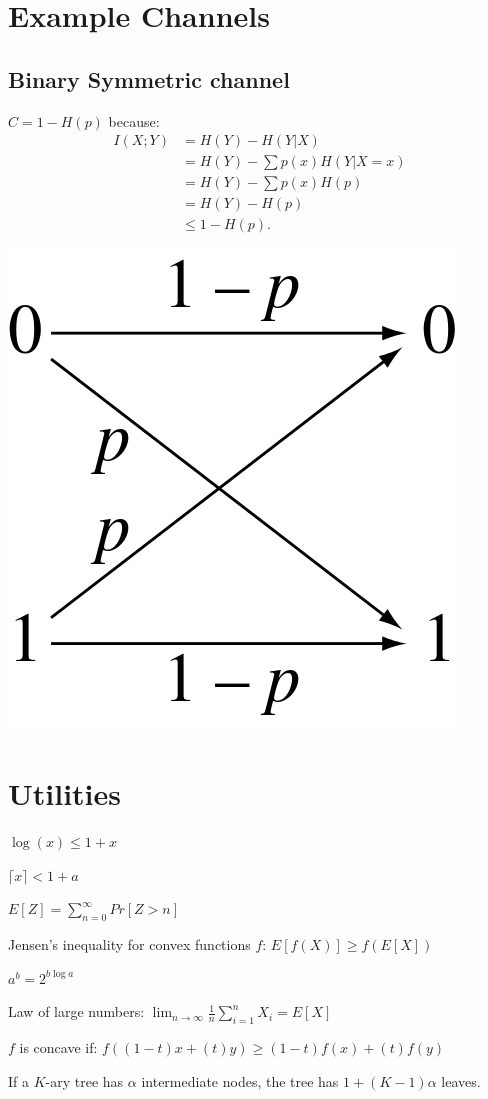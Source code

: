 \documentclass[10pt,a4paper,landscape]{article}
\begin{document}
\begin{multicols*}{4}
\section{Example Channels}
\subsection{Binary Symmetric channel}
$C = 1 - H(p)$ because:
\begin{align}
	I(X; Y) &= H(Y) - H(Y | X)\\
			&= H(Y) - \sum p(x) H(Y| X = x)\\
			&= H(Y) - \sum p(x) H(p)\\
			&= H(Y) - H(p)\\
			&\leq 1 - H(p).
\end{align}
\begin{colfig}
	\centering
	\includegraphics[width=0.6\linewidth]{binary-symmetric-channel.png}
\end{colfig}



\section{Utilities}
$\log(x) \leq 1 + x$

$\lceil x \rceil < 1 + a$

$E[Z] = \sum_{n=0}^{\infty} Pr[Z > n]$

Jensen's inequality for convex functions $f$: $ E[f(X)] \geq f(E[X])$

$a^b = 2^{ b \log a}$

Law of large numbers: $\lim_{n \rightarrow \infty} \frac{1}{n} \sum_{i=1}^n X_i = E[X]$

$f$ is concave if: $f((1-t)x+(t)y)\geq (1-t) f(x)+(t)f(y)$

If a $K$-ary tree has $\alpha$ intermediate nodes, the tree has $1+(K-1)\alpha$ leaves.

\end{multicols*}
\end{document}
